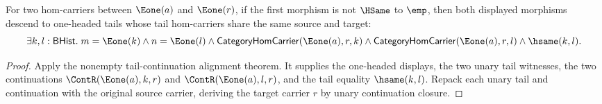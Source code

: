 \begin{theorem}
\label{thm:category-e1-source-e1-target-nonempty-morphism-tail-carrier-alignment}
For two hom-carriers between $\Eone(a)$ and $\Eone(r)$, if the first morphism
is not $\HSame$ to $\emp$, then both displayed morphisms descend to
one-headed tails whose tail hom-carriers share the same source and target:
$$
\exists k,l:\mathsf{BHist}.\;
m=\Eone(k)\land n=\Eone(l)\land
\mathsf{CategoryHomCarrier}(\Eone(a),r,k)\land
\mathsf{CategoryHomCarrier}(\Eone(a),r,l)\land
\hsame(k,l).
$$
\end{theorem}
\begin{proof}
Apply the nonempty tail-continuation alignment theorem. It supplies the
one-headed displays, the two unary tail witnesses, the two continuations
$\ContR(\Eone(a),k,r)$ and $\ContR(\Eone(a),l,r)$, and the tail equality
$\hsame(k,l)$. Repack each unary tail and continuation with the original
source carrier, deriving the target carrier $r$ by unary continuation closure.
\end{proof}

